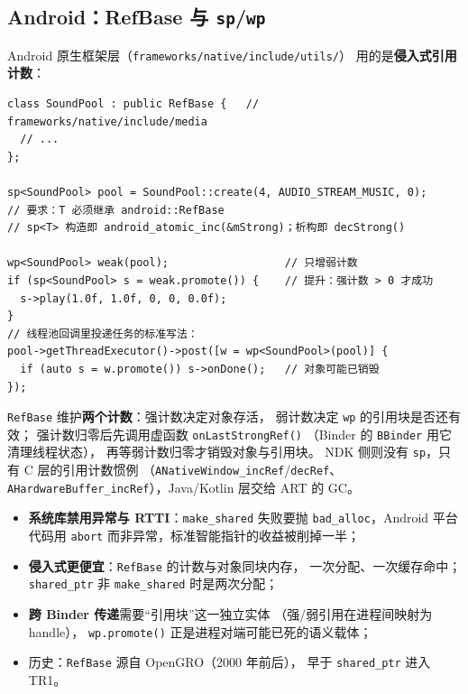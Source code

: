 \documentclass[12pt,a4paper,fontset=fandol]{ctexbook}
\begin{document}
\subsection{Android：RefBase 与 \texttt{sp}/\texttt{wp}}

Android 原生框架层（\texttt{frameworks/native/include/utils/}）
用的是\textbf{侵入式引用计数}：

\begin{lstlisting}
class SoundPool : public RefBase {   // frameworks/native/include/media
  // ...
};

sp<SoundPool> pool = SoundPool::create(4, AUDIO_STREAM_MUSIC, 0);
// 要求：T 必须继承 android::RefBase
// sp<T> 构造即 android_atomic_inc(&mStrong)；析构即 decStrong()

wp<SoundPool> weak(pool);                  // 只增弱计数
if (sp<SoundPool> s = weak.promote()) {    // 提升：强计数 > 0 才成功
  s->play(1.0f, 1.0f, 0, 0, 0.0f);
}
// 线程池回调里投递任务的标准写法：
pool->getThreadExecutor()->post([w = wp<SoundPool>(pool)] {
  if (auto s = w.promote()) s->onDone();   // 对象可能已销毁
});
\end{lstlisting}

\texttt{RefBase} 维护\textbf{两个计数}：强计数决定对象存活，
弱计数决定 \texttt{wp} 的引用块是否还有效；
强计数归零后先调用虚函数 \texttt{onLastStrongRef()}
（Binder 的 \texttt{BBinder} 用它清理线程状态），
再等弱计数归零才销毁对象与引用块。
NDK 侧则没有 \texttt{sp}，只有 C 层的引用计数惯例
（\texttt{ANativeWindow\_incRef}/\allowbreak{}\texttt{decRef}、
\texttt{AHardwareBuffer\_incRef}），Java/Kotlin 层交给 ART 的 GC。

\begin{compare}[title=为什么 Android 不用 \texttt{std::shared\_ptr}]
\begin{itemize}
  \item \textbf{系统库禁用异常与 RTTI}：\texttt{make\_shared}
        失败要抛 \texttt{bad\_alloc}，Android 平台代码用
        \texttt{abort} 而非异常，标准智能指针的收益被削掉一半；
  \item \textbf{侵入式更便宜}：\texttt{RefBase} 的计数与对象同块内存，
        一次分配、一次缓存命中；\texttt{shared\_ptr}
        非 \texttt{make\_shared} 时是两次分配；
  \item \textbf{跨 Binder 传递}需要``引用块''这一独立实体
        （强/弱引用在进程间映射为 handle），
        \texttt{wp.promote()} 正是进程对端可能已死的语义载体；
  \item 历史：\texttt{RefBase} 源自 OpenGRO（2000 年前后），
        早于 \texttt{shared\_ptr} 进入 TR1。
\end{itemize}
\end{compare}
\end{document}
